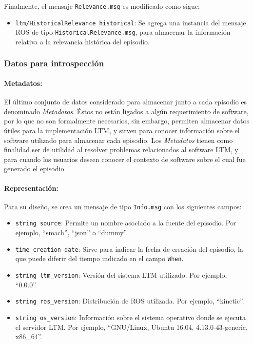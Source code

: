 Finalmente, el mensaje \texttt{Relevance.msg} es modificado como sigue:
\begin{itemize}
	\item \texttt{ltm/HistoricalRelevance historical}: Se agrega una instancia del mensaje ROS de tipo \texttt{HistoricalRelevance.msg}, para almacenar la información relativa a la relevancia histórica del episodio.
\end{itemize}


\subsubsection{Datos para introspección}

\paragraph{Metadatos:}
El último conjunto de datos considerado para almacenar junto a cada episodio es denominado \textit{Metadatos}. Éstos no están ligados a algún requerimiento de software, por lo que no son formalmente necesarios, sin embargo, permiten almacenar datos útiles para la implementación LTM, y sirven para conocer información sobre el software utilizado para almacenar cada episodio. Los \textit{Metadatos} tienen como finalidad ser de utilidad al resolver problemas relacionados al software LTM, y para cuando los usuarios deseen conocer el contexto de software sobre el cual fue generado el episodio.

\paragraph{Representación:}
Para su diseño, se crea un mensaje de tipo \texttt{Info.msg} con los siguientes campos:
\begin{itemize}
\item \texttt{string source}: Permite un nombre asociado a la fuente del episodio. Por ejemplo, ``smach'', ``json'' o ``dummy''.
\item \texttt{time creation\_date}: Sirve para indicar la fecha de creación del episodio, la que puede diferir del tiempo indicado en el campo \texttt{When}.
\item \texttt{string ltm\_version}: Versión del sistema LTM utilizado. Por ejemplo, ``0.0.0''.
\item \texttt{string ros\_version}: Distribución de ROS utilizada. Por ejemplo, ``kinetic''.
\item \texttt{string os\_version}: Información sobre el sistema operativo donde se ejecuta el servidor LTM. Por ejemplo, ``GNU/Linux, Ubuntu 16.04, 4.13.0-43-generic, x86\_64''.
\end{itemize}

